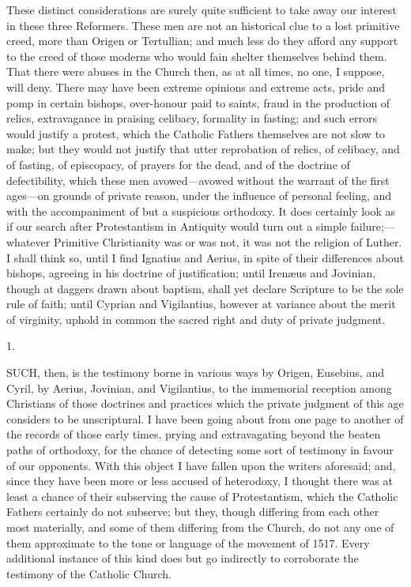 These distinct considerations are surely quite sufficient to take
away our interest in these three Reformers. These men are not an
historical clue to a lost primitive creed, more than Origen or
Tertullian; and much less do they afford any support to the creed of
those moderns who would fain shelter themselves behind them. That
there were abuses in the Church then, as at all times, no one, I
suppose, will deny. There may have been extreme opinions and extreme
acts, pride and pomp in certain bishops, over-honour paid to saints,
fraud in the production of relics, extravagance in praising celibacy,
formality in fasting; and such errors would justify a protest, which
the Catholic Fathers themselves are not slow to make; but they would
not justify that utter reprobation of relics, of celibacy, and of
fasting, of episcopacy, of prayers for the dead, and of the doctrine
of defectibility, which these men avowed—avowed without the warrant
of the first ages—on grounds of private reason, under the influence
of personal feeling, and with the accompaniment of but a suspicious
orthodoxy. It does certainly look as if our search after Protestantism
in Antiquity would turn out a simple failure;—whatever Primitive
Christianity was or was not, it was not the religion of Luther. I
shall think so, until I find Ignatius and Aerius, in spite of their
differences about bishops, agreeing in his doctrine of justification;
until Irenæus and Jovinian, though at daggers drawn about baptism,
shall yet declare Scripture to be the sole rule of faith; until
Cyprian and Vigilantius, however at variance about the merit of
virginity, uphold in common the sacred right and duty of private
judgment.


1.

SUCH, then, is the testimony borne in
various ways by Origen, Eusebius, and Cyril, by Aerius, Jovinian, and
Vigilantius, to the immemorial reception among Christians of those
doctrines and practices which the private judgment of this age
considers to be unscriptural. I have been going about from one page to
another of the records of those early times, prying and extravagating
beyond the beaten paths of orthodoxy, for the chance of detecting some
sort of testimony in favour of our opponents. With this object I have
fallen upon the writers aforesaid; and, since they have been more or
less accused of heterodoxy, I thought there was at least a chance of
their subserving the cause of Protestantism, which the Catholic
Fathers certainly do not subserve; but they, though differing from
each other most materially, and some of them differing from the
Church, do not any one of them approximate to the tone or language of
the movement of 1517. Every additional instance of this kind does but
go indirectly to corroborate the testimony of the Catholic Church.


